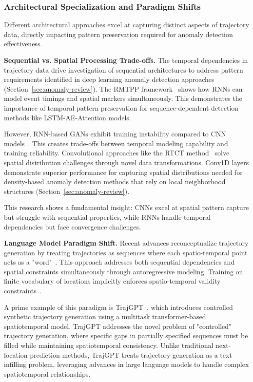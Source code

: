 \subsubsection{Architectural Specialization and Paradigm Shifts}

Different architectural approaches excel at capturing distinct aspects of trajectory data, directly impacting pattern preservation required for anomaly detection effectiveness.

\textbf{Sequential vs. Spatial Processing Trade-offs.} The temporal dependencies in trajectory data drive investigation of sequential architectures to address pattern requirements identified in deep learning anomaly detection approaches (Section~\ref{sec:anomaly-review}). The RMTPP framework~\cite{duRecurrentMarkedTemporal2016} shows how RNNs can model event timings and spatial markers simultaneously. This demonstrates the importance of temporal pattern preservation for sequence-dependent detection methods like LSTM-AE-Attention models.

However, RNN-based GANs exhibit training instability compared to CNN models~\cite{merhiSyntheticTrajectoryGeneration2024}. This creates trade-offs between temporal modeling capability and training reliability. Convolutional approaches like the RTCT method~\cite{merhiSyntheticTrajectoryGeneration2024} solve spatial distribution challenges through novel data transformations. Conv1D layers demonstrate superior performance for capturing spatial distributions needed for density-based anomaly detection methods that rely on local neighborhood structures (Section~\ref{sec:anomaly-review}).

This research shows a fundamental insight: CNNs excel at spatial pattern capture but struggle with sequential properties, while RNNs handle temporal dependencies but face convergence challenges.

\textbf{Language Model Paradigm Shift.} Recent advances reconceptualize trajectory generation by treating trajectories as sequences where each spatio-temporal point acts as a "word"~\cite{zhangEndtoendTrajectoryGeneration2025}. This approach addresses both sequential dependencies and spatial constraints simultaneously through autoregressive modeling. Training on finite vocabulary of locations implicitly enforces spatio-temporal validity constraints~\cite{kongMobilityTrajectoryGeneration2023}.

A prime example of this paradigm is TrajGPT~\cite{hsuTrajGPTControlledSynthetic2024}, which introduces controlled synthetic trajectory generation using a multitask transformer-based spatiotemporal model. TrajGPT addresses the novel problem of "controlled" trajectory generation, where specific gaps in partially specified sequences must be filled while maintaining spatiotemporal consistency. Unlike traditional next-location prediction methods, TrajGPT treats trajectory generation as a text infilling problem, leveraging advances in large language models to handle complex spatiotemporal relationships.

